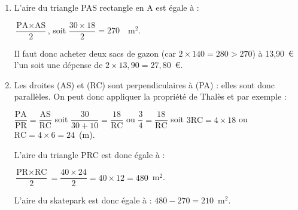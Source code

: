 
%
%
%
%
%
%
%

\begin{enumerate}
\item %

L'aire du  triangle PAS rectangle en A est égale à :

$\dfrac{\text{PA} \times  \text{AS}}{2}$, soit $\dfrac{30 \times 18}{2} = 270$~~m$^2$.

Il faut donc acheter deux sacs de gazon (car $2 \times 140 = 280 > 270$) à 13,90~\euro{} l'un soit une dépense de $2\times 13,90 = 27,80$~\euro.
\item %
Les droites (AS) et (RC) sont perpendiculaires à (PA) : elles sont donc parallèles. On peut donc appliquer la propriété de Thalès et par exemple :

$\dfrac{\text{PA}}{\text{PR}} =  \dfrac{\text{AS}}{\text{RC}}$ soit $\dfrac{30}{30+10} =  \dfrac{18}{\text{RC}}$ ou $\dfrac{3}{4} = \dfrac{18}{\text{RC}}$ soit $3\text{RC} = 4 \times 18$ ou $\text{RC} = 4 \times 6 = 24$~(m).

L'aire du triangle PRC est donc égale à :

$\dfrac{\text{PR}\times \text{RC}}{2} = \dfrac{40 \times 24}{2} = 40 \times 12 = 480$~m$^2$.

L'aire du \og skatepark \fg{} est donc égale à : $480 - 270 = 210$~m$^2$.
\end{enumerate}

\bigskip

